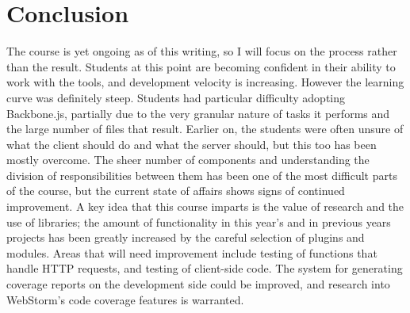 \documentclass[12pt]{article}
\begin{document}
\section{Conclusion}\label{sec:conclusion}
The course is yet ongoing as of this writing, so I will focus on the process rather than the result. Students at this point are becoming confident in their ability to work with the tools, and development velocity is increasing. However the learning curve was definitely steep. Students had particular difficulty adopting Backbone.js, partially due to the very granular nature of tasks it performs and the large number of files that result. Earlier on, the students were often unsure of what the client should do and what the server should, but this too has been mostly overcome. The sheer number of components and understanding the division of responsibilities between them has been one of the most  difficult parts of the course, but the current state of affairs shows signs of continued improvement. A key idea that this course imparts is the value of research and the use of libraries; the amount of functionality in this year's and in previous years projects has been greatly increased by the careful selection of plugins and modules. Areas that will need improvement include testing of functions that handle HTTP requests, and testing of client-side code. The system for generating coverage reports on the development side could be improved, and research into WebStorm's code coverage features is warranted.



%
%




%  
%
%


\end{document}

